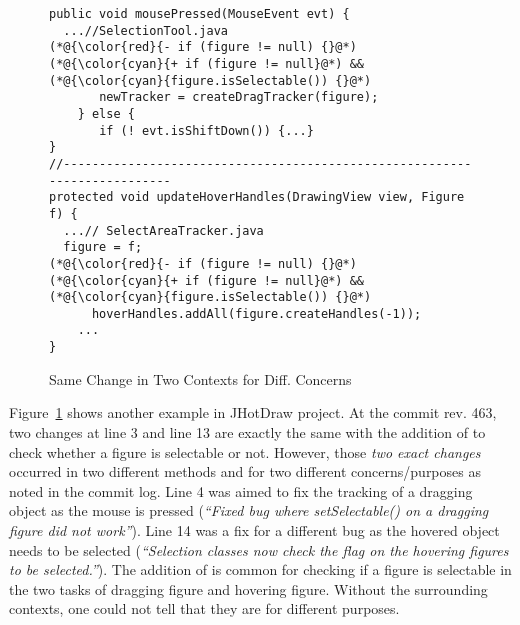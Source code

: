 \begin{figure}[t]
	\centering
	\begin{lstlisting}[]
public void mousePressed(MouseEvent evt) { 
  ...//SelectionTool.java
(*@{\color{red}{- if (figure != null) {}@*)
(*@{\color{cyan}{+ if (figure != null}@*) && (*@{\color{cyan}{figure.isSelectable()) {}@*)
       newTracker = createDragTracker(figure);
    } else {
       if (! evt.isShiftDown()) {...}
}
//--------------------------------------------------------------------------
protected void updateHoverHandles(DrawingView view, Figure f) {
  ...// SelectAreaTracker.java
  figure = f;
(*@{\color{red}{- if (figure != null) {}@*)
(*@{\color{cyan}{+ if (figure != null}@*) && (*@{\color{cyan}{figure.isSelectable()) {}@*)
      hoverHandles.addAll(figure.createHandles(-1));
    ...
}
	\end{lstlisting}
        \vspace{-15pt}
        \caption{Same Change in Two Contexts for Diff. Concerns}
        \vspace{-6pt}
        \label{fig:motiv-context}
\end{figure}

Figure~\ref{fig:motiv-context} shows another example in JHotDraw
project. At the commit rev. 463, two changes at line 3 and line 13 are
exactly the same with the addition of  to
check whether a figure is selectable or not. However, those {\em two
  exact changes} occurred in two different methods 
and  for two different concerns/purposes as
noted in the commit log. Line 4 was aimed to fix the tracking of a
dragging object as the mouse is pressed ({\em ``Fixed bug where
  setSelectable() on a dragging figure did not work''}).  Line 14 was
a fix for a different bug as the hovered object needs to be selected
({\em ``Selection classes now check the flag on the hovering figures
  to be selected.''}). The addition of  is
common for checking if a figure is selectable in the two tasks of
dragging figure and hovering figure. Without the surrounding contexts,
one could not tell that they are for different purposes.

